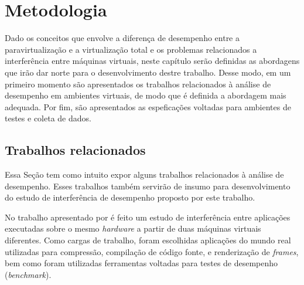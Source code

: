 \chapter{Metodologia}
\label{cap:metodologia}
Dado os conceitos que envolve a diferença de desempenho entre a paravirtualização e a virtualização total e os problemas relacionados a interferência entre máquinas virtuais, neste capítulo serão definidas as abordagens que irão dar norte para o desenvolvimento destre trabalho. Desse modo, em um primeiro momento são apresentados os trabalhos relacionados à análise de desempenho em ambientes virtuais, de modo que é definida a abordagem mais adequada. Por fim, são apresentados as espeficações voltadas para ambientes de testes e coleta de dados.
\section{Trabalhos relacionados}
Essa Seção tem como intuito expor alguns trabalhos relacionados à análise de desempenho. Esses trabalhos também servirão de insumo para desenvolvimento do estudo de interferência de desempenho proposto por este trabalho.

No trabalho apresentado por \cite{koh2007} é feito um estudo de interferência entre aplicações executadas sobre o mesmo \textit{hardware} a partir de duas máquinas virtuais diferentes. Como cargas de trabalho, foram escolhidas aplicações do mundo real utilizadas para compressão, compilação de código fonte, e renderização de \textit{frames}, bem como foram utilizadas ferramentas voltadas para testes de desempenho (\textit{benchmark}).


